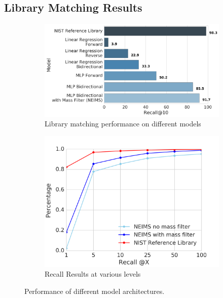 \documentclass{article}
\begin{document}
\subsection{Library Matching Results}
\label{sec:library-matching-results}
\begin{figure}[h]
    \centering
    \begin{subfigure}[b]{0.52\linewidth}
        \includegraphics[width=\linewidth]{./all_models_w_massfilter.png}
        \caption[Library Matching Results]{Library matching performance on different models}
    \end{subfigure}
    \begin{subfigure}[b]{0.42\linewidth}
        \includegraphics[width=\linewidth]{./recall_at_X.png}
        \caption[Recall@X Results for Different models]{Recall Results at various levels}
    \end{subfigure}
    \caption{Performance of different model architectures.}
    \label{fig:main_results_and_recall_results}
\end{figure}
\end{document}
